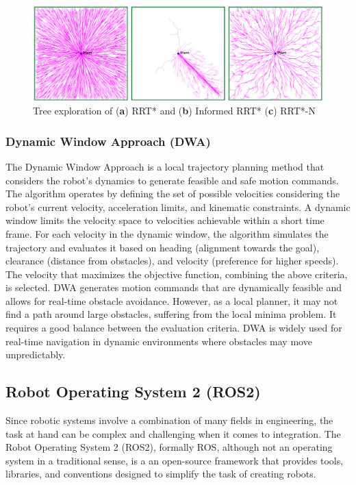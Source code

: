\vspace{-0.02cm}

\begin{figure}[H]
    \centering
    \includegraphics[width=5.2in]{pics/rrt.png}
    \caption[Tree exploration of (\textbf{a}) RRT* and (\textbf{b}) RRT* Connect]{Tree exploration of (\textbf{a}) RRT* and (\textbf{b}) Informed RRT* (\textbf{c}) RRT*-N~\cite{ganesan2024hybrid}}\label{fig:rrt}
\end{figure}


\newpage

\subsubsection{Dynamic Window Approach (DWA)}
The Dynamic Window Approach is a local trajectory planning method that considers
the robot's dynamics to generate feasible and safe motion commands. The algorithm operates by defining
the set of possible velocities considering the robot's current velocity, acceleration limits, and kinematic constraints. A dynamic window limits the velocity space to velocities achievable within a short time frame. For each velocity in the dynamic window, the algorithm simulates the trajectory and evaluates it based on heading (alignment towards the goal), clearance (distance from obstacles), and velocity (preference for higher speeds). The velocity that 
maximizes the objective function, combining the above criteria, is selected. DWA generates motion commands
that are dynamically feasible and allows for real-time obstacle avoidance. However, as a local planner, it may not find a path around large obstacles, suffering from the local minima problem. It requires a good balance between the evaluation criteria. DWA is widely used for real-time navigation in dynamic environments where obstacles may move unpredictably.






\subsection{Robot Operating System 2 (ROS2)}
Since robotic systems involve a combination of many fields in engineering, the task at hand can be complex
and challenging when it comes to integration.
The Robot Operating System 2 (ROS2), formally ROS,  although not an operating system in a traditional sense, is a an open-source framework that provides tools,
libraries, and conventions designed to simplify the task of creating robots.   

